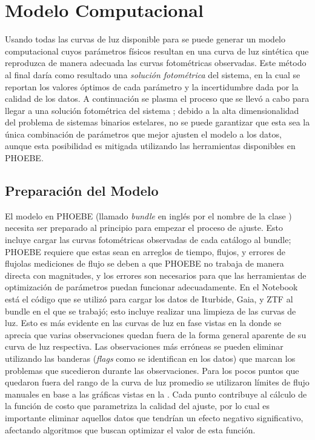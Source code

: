 \chapter{Modelo Computacional} \label{metodologia:modelocomputacional}

Usando todas las curvas de luz disponible para \atoObjId se puede
generar un modelo computacional cuyos parámetros físicos resultan en una curva
de luz sintética que reproduzca de manera adecuada las curvas fotométricas
observadas. Este método al final daría como resultado una \textit{solución
fotométrica} del sistema, en la cual se reportan los valores óptimos de cada
parámetro y la incertidumbre dada por la calidad de los datos. A continuación se
plasma el proceso que se llevó a cabo para llegar a una solución fotométrica del
sistema \atoObjIdNoSpace; debido a la alta dimensionalidad del problema de
sistemas binarios estelares, no se puede garantizar que esta sea la única
combinación de parámetros que mejor ajusten el modelo a los datos, aunque esta
posibilidad es mitigada utilizando las herramientas disponibles en PHOEBE.

\section{Preparación del Modelo} \label{metodologia:modelocomputacional:preparacion_modelo}

El modelo en PHOEBE (llamado \textit{bundle} en inglés por el nombre de la clase
) necesita ser preparado al principio para empezar el
proceso de ajuste. Esto incluye cargar las curvas fotométricas observadas de
cada catálogo al bundle; PHOEBE requiere que estas sean en arreglos de tiempo,
flujos, y errores de flujo\textemdash las mediciones de flujo se deben a que
PHOEBE no trabaja de manera directa con magnitudes, y los errores son necesarios
para que las herramientas de optimización de parámetros puedan funcionar
adecuadamente. En el Notebook
\href{https://github.com/KnightIV/UANL_MAPTA_Observaciones/blob/main/analisis/phoebe_model/initial-model-prep.ipynb}{}
está el código que se utilizó para cargar los datos de Iturbide, Gaia, y ZTF al
bundle en el que se trabajó; esto incluye realizar una limpieza de las curvas de
luz. Esto es más evidente en las curvas de luz en fase vistas en la
 donde se aprecia que varias
observaciones quedan fuera de la forma general aparente de su curva de luz
respectiva. Las observaciones más erróneas se pueden eliminar utilizando las
banderas (\textit{flags} como se identifican en los datos) que marcan los
problemas que sucedieron durante las observaciones. Para los pocos puntos que
quedaron fuera del rango de la curva de luz promedio se utilizaron límites de
flujo manuales en base a las gráficas vistas en la
. Cada punto contribuye al cálculo de
la función de costo que parametriza la calidad del ajuste, por lo cual es
importante eliminar aquellos datos que tendrían un efecto negativo
significativo, afectando algoritmos que buscan optimizar el valor de esta
función.

